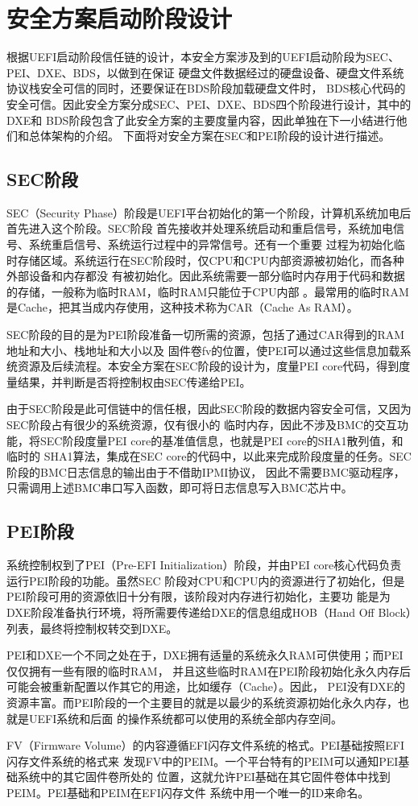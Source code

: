%
%
\section{安全方案启动阶段设计}
根据UEFI启动阶段信任链的设计，本安全方案涉及到的UEFI启动阶段为SEC、PEI、DXE、BDS，以做到在保证
硬盘文件数据经过的硬盘设备、硬盘文件系统协议栈安全可信的同时，还要保证在BDS阶段加载硬盘文件时，
BDS核心代码的安全可信。因此安全方案分成SEC、PEI、DXE、BDS四个阶段进行设计\cite{english1}，其中的DXE和
BDS阶段包含了此安全方案的主要度量内容，因此单独在下一小结进行他们和总体架构的介绍。
下面将对安全方案在SEC和PEI阶段的设计进行描述。

\subsection{SEC阶段}
SEC（Security Phase）阶段是UEFI平台初始化的第一个阶段，计算机系统加电后首先进入这个阶段。SEC阶段
首先接收并处理系统启动和重启信号，系统加电信号、系统重启信号、系统运行过程中的异常信号。还有一个重要
过程为初始化临时存储区域。系统运行在SEC阶段时，仅CPU和CPU内部资源被初始化，而各种外部设备和内存都没
有被初始化。因此系统需要一部分临时内存用于代码和数据的存储，一般称为临时RAM，临时RAM只能位于CPU内部
。最常用的临时RAM是Cache，把其当成内存使用，这种技术称为CAR（Cache As RAM）。
\par SEC阶段的目的是为PEI阶段准备一切所需的资源，包括了通过CAR得到的RAM地址和大小、栈地址和大小以及
固件卷fv的位置，使PEI可以通过这些信息加载系统资源及后续流程。本安全方案在SEC阶段的设计为，度量PEI 
core代码，得到度量结果，并判断是否将控制权由SEC传递给PEI。

\par 由于SEC阶段是此可信链中的信任根，因此SEC阶段的数据内容安全可信，又因为SEC阶段占有很少的系统资源，仅有很小的
临时内存，因此不涉及BMC的交互功能，将SEC阶段度量PEI core的基准值信息，也就是PEI core的SHA1散列值，和临时的
SHA1算法，集成在SEC core的代码中，以此来完成阶段度量的任务。SEC阶段的BMC日志信息的输出由于不借助IPMI协议，
因此不需要BMC驱动程序，只需调用上述BMC串口写入函数，即可将日志信息写入BMC芯片中。

\subsection{PEI阶段}
系统控制权到了PEI（Pre-EFI Initialization）阶段，并由PEI core核心代码负责运行PEI阶段的功能。虽然SEC
阶段对CPU和CPU内的资源进行了初始化，但是PEI阶段可用的资源依旧十分有限，该阶段对内存进行初始化，主要功
能是为DXE阶段准备执行环境，将所需要传递给DXE的信息组成HOB（Hand Off Block）列表，最终将控制权转交到DXE。
\par PEI和DXE一个不同之处在于，DXE拥有适量的系统永久RAM可供使用；而PEI仅仅拥有一些有限的临时RAM，
并且这些临时RAM在PEI阶段初始化永久内存后可能会被重新配置以作其它的用途，比如缓存（Cache）。因此，
PEI没有DXE的资源丰富。而PEI阶段的一个主要目的就是以最少的系统资源初始化永久内存，也就是UEFI系统和后面
的操作系统都可以使用的系统全部内存空间。
\par FV（Firmware Volume）的内容遵循EFI闪存文件系统的格式。PEI基础按照EFI闪存文件系统的格式来
发现FV中的PEIM。一个平台特有的PEIM可以通知PEI基础系统中的其它固件卷所处的
位置，这就允许PEI基础在其它固件卷体中找到PEIM。PEI基础和PEIM在EFI闪存文件
系统中用一个唯一的ID来命名。

